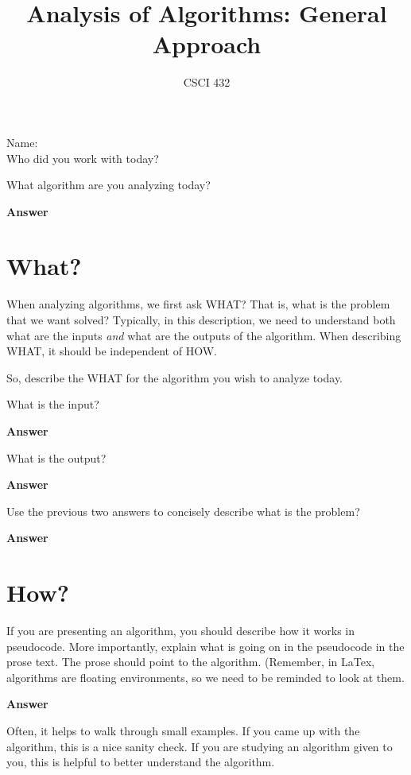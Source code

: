 \documentclass{article}
\title{Analysis of Algorithms: General Approach}
\author{CSCI 432}
\begin{document}
\maketitle

\noindent
Name:\\
Who did you work with today?

What algorithm are you analyzing today?

\textbf{Answer}
\vspace{1in}

\section{What?}

When analyzing algorithms, we first ask WHAT?  That is, what is the problem that
we want solved?  Typically, in this description, we need to understand both what
are the inputs \emph{and} what are the outputs of the algorithm.  When
describing WHAT, it should be independent of HOW.

So, describe the WHAT for the algorithm you wish to analyze today.

What is the input?

\textbf{Answer}
\vspace{1in}

What is the output?

\textbf{Answer}
\vspace{1in}

Use the previous two answers to concisely describe what is the problem?

\textbf{Answer}
\vspace{1in}

\section{How?}

If you are presenting an algorithm, you should describe how it works in
pseudocode.  More importantly, explain what is going on in the pseudocode in the
prose text.  The prose should point to the algorithm.  (Remember, in LaTex,
algorithms are floating environments, so we need to be reminded to look at them.

\textbf{Answer}
\vspace{3in}

Often, it helps to walk through small examples.  If you came up with the
algorithm, this is a nice sanity check.  If you are studying an algorithm given
to you, this is helpful to better understand the algorithm.
\end{document}
